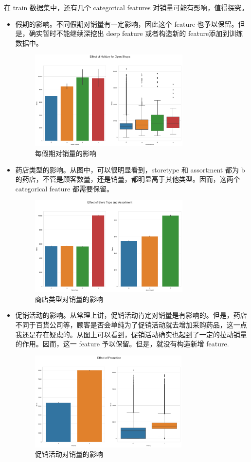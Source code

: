 \documentclass[a4paper]{article}
\begin{document}
在 train 数据集中，还有几个 categorical features 对销量可能有影响，值得探究。
\begin{itemize}

\item 假期的影响。不同假期对销量有一定影响，因此这个 feature 也予以保留。但是，确实暂时不能继续深挖出 deep feature 或者构造新的 feature添加到训练数据中。

\begin{figure}[ht]
 \centering
 \includegraphics[height=5cm]{images/effect-holiday.png}
 \caption{每假期对销量的影响}
 \label{fig:holiday}
\end{figure}

\item 药店类型的影响。从图中，可以很明显看到，storetype 和 assortment 都为 b 的药店，不管是顾客数量，还是销量，都明显高于其他类型。因而，这两个 categorical feature 都需要保留。

\begin{figure}[ht]
 \centering
 \includegraphics[height=5cm]{images/store-type.png}
 \caption{商店类型对销量的影响}
 \label{fig:storetype}
\end{figure}

\item 促销活动的影响。从常理上讲，促销活动肯定对销量是有影响的。但是，药店不同于百货公司等，顾客是否会单纯为了促销活动就去增加采购药品，这一点我还是存在疑虑的。从图上可以看到，促销活动确实也起到了一定的拉动销量的作用。因而，这一 feature 予以保留。但是，就没有构造新增 feature.
\begin{figure}[ht]
 \centering
 \includegraphics[height=5cm]{images/effect-promo.png}
 \caption{促销活动对销量的影响}
 \label{fig:promo}
\end{figure}
\end{itemize}
\end{document}
